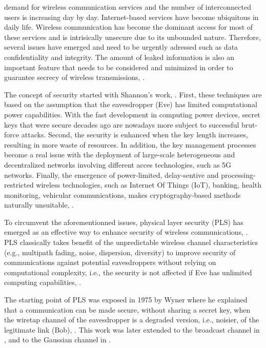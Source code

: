 \documentclass[journal,comsoc]{IEEEtran}
\begin{document}
 demand for wireless communication services and the number of interconnected users is increasing day by day. Internet-based services have become ubiquitous in daily life. Wireless communication has become the dominant access for most of these services and is intrisically unsecure due to its unbounded nature. Therefore, several issues have emerged and need to be urgently adressed such as data confidentiality and integrity. The amount of leaked information is also an important feature that needs to be considered and minimized in order to guarantee secrecy of wireless transmissions, \cite{8509094,8543573,BlochMatthieu1981-2011Ps:f}.

The concept of security started with Shannon's work, \cite{6769090}. First, these techniques are based on the assumption that the eavesdropper (Eve) has limited computational power capabilities. With the fast development in computing power devices, secret keys that were secure decades ago are nowadays more subject to successful brut-force attacks. Second, the security is enhanced when the key length increases, resulting in more waste of resources. In addition, the key management processes become a real issue with the deployment of large-scale heterogeneous and decentralized networks involving different acces technologies, such as 5G networks. Finally, the emergence of power-limited, delay-sentive and processing-restricted wireless technologies, such as Internet Of Things (IoT), banking, health monitoring, vehicular communications, makes cryptography-based methods naturally unsuitable, \cite{8509094}.

To circumvent the aforementionned issues, physical layer security (PLS) has emerged as an effective way to enhance security of wireless communications, \cite{alves2012performance,yang2012physical,tran2015secrecy,8353879}. PLS classically takes benefit of the unpredictable wireless channel characteristics (e.g., multipath fading, noise, dispersion, diversity) to improve security of communications against potential eavesdroppers without relying on computational complexity, i.e., the security is not affected if Eve has unlimited computing capabilities, \cite{9049811,snchez2020survey}. 

The starting point of PLS was exposed in 1975 by Wyner where he explained that a communication can be made secure, without sharing a secret key, when the wiretap channel of the eavesdropper is a degraded version, i.e., noisier, of the legitimate link (Bob), \cite{6772207}. This work was later extended to the broadcast channel in \cite{1055892}, and to the Gaussian channel in \cite{1055917}. 
\end{document}
